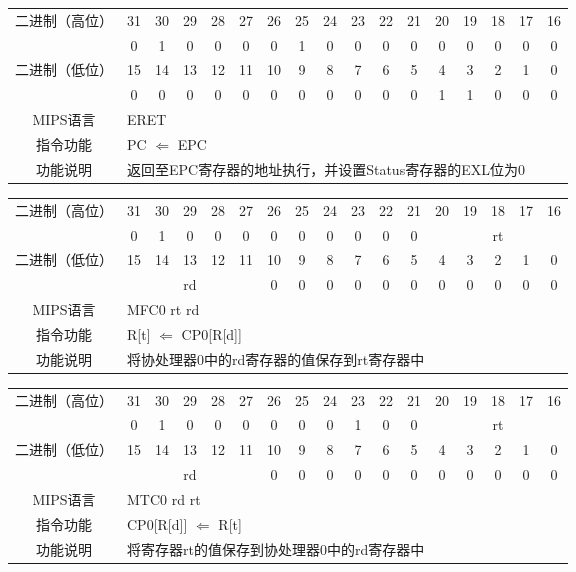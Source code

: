 \begin{table}
\begin{tabular}{|c|c|c|c|c|c|c|c|c|c|c|c|c|c|c|c|c|}
\hline
\multirow{2}{*}{二进制（高位）} &
31&30&29&28&27&26&25&24&23&22&21&20&19&18&17&16\\
\cline{2-17}
&
0&1&0&0&0&
0&1&0&0&0&
0&0&0&0&0&
0\\
\hline
\multirow{2}{*}{二进制（低位）} &
15&14&13&12&11&10&9&8&7&6&5&4&3&2&1&0\\
\cline{2-17}
&
0&0&0&0&0&
0&0&0&0&0&
0&1&1&0&0&
0\\
\hline
MIPS语言&
\multicolumn{16}{l|}{ERET}\\
\hline
指令功能&
\multicolumn{16}{l|}{PC $\Leftarrow$ EPC}\\
\hline
功能说明&
\multicolumn{16}{l|}{返回至EPC寄存器的地址执行，并设置Status寄存器的EXL位为0}\\
\hline
\end{tabular}
\end{table}

\clearpage

\begin{table}
\begin{tabular}{|c|c|c|c|c|c|c|c|c|c|c|c|c|c|c|c|c|}
\hline
\multirow{2}{*}{二进制（高位）} &
31&30&29&28&27&26&25&24&23&22&21&20&19&18&17&16\\
\cline{2-17}
&
0&1&0&0&0&
0&0&0&0&0&
0&
\multicolumn{5}{c|}{rt}\\
\hline
\multirow{2}{*}{二进制（低位）} &
15&14&13&12&11&10&9&8&7&6&5&4&3&2&1&0\\
\cline{2-17}
&
\multicolumn{5}{c|}{rd} &
0&0&0&0&0&
0&0&0&0&0&
0\\
\hline
MIPS语言&
\multicolumn{16}{l|}{MFC0 rt rd}\\
\hline
指令功能&
\multicolumn{16}{l|}{R[t] $\Leftarrow$ CP0[R[d]]}\\
\hline
功能说明&
\multicolumn{16}{l|}{将协处理器0中的rd寄存器的值保存到rt寄存器中}\\
\hline
\end{tabular}
\end{table}

\begin{table}
\begin{tabular}{|c|c|c|c|c|c|c|c|c|c|c|c|c|c|c|c|c|}
\hline
\multirow{2}{*}{二进制（高位）} &
31&30&29&28&27&26&25&24&23&22&21&20&19&18&17&16\\
\cline{2-17}
&
0&1&0&0&0&
0&0&0&1&0&
0&
\multicolumn{5}{c|}{rt}\\
\hline
\multirow{2}{*}{二进制（低位）} &
15&14&13&12&11&10&9&8&7&6&5&4&3&2&1&0\\
\cline{2-17}
&
\multicolumn{5}{c|}{rd} &
0&0&0&0&0&
0&0&0&0&0&
0\\
\hline
MIPS语言&
\multicolumn{16}{l|}{MTC0 rd rt}\\
\hline
指令功能&
\multicolumn{16}{l|}{CP0[R[d]] $\Leftarrow$ R[t]}\\
\hline
功能说明&
\multicolumn{16}{l|}{将寄存器rt的值保存到协处理器0中的rd寄存器中}\\
\hline
\end{tabular}
\end{table}


